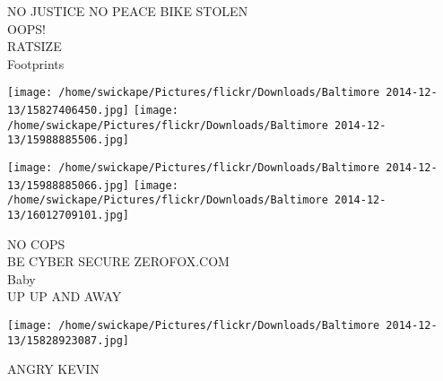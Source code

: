 \documentclass[10pt,letterpaper]{article}
\begin{document}
NO JUSTICE NO PEACE BIKE STOLEN\\
OOPS!\\
RATSIZE\\
Footprints
\pagebreak

\texttt{[image: /home/swickape/Pictures/flickr/Downloads/Baltimore 2014-12-13/15827406450.jpg]}
\texttt{[image: /home/swickape/Pictures/flickr/Downloads/Baltimore 2014-12-13/15988885506.jpg]}

\texttt{[image: /home/swickape/Pictures/flickr/Downloads/Baltimore 2014-12-13/15988885066.jpg]}
\texttt{[image: /home/swickape/Pictures/flickr/Downloads/Baltimore 2014-12-13/16012709101.jpg]}

NO COPS\\
BE CYBER SECURE ZEROFOX.COM\\
Baby\\
UP UP AND AWAY
\pagebreak

\texttt{[image: /home/swickape/Pictures/flickr/Downloads/Baltimore 2014-12-13/15828923087.jpg]}

ANGRY KEVIN
\pagebreak
\end{document}

